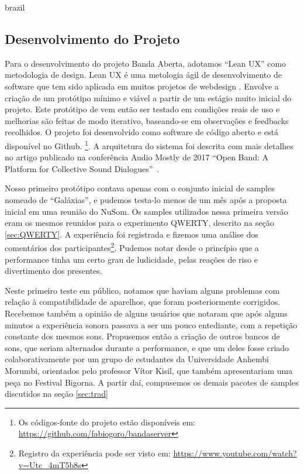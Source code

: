 \begin{otherlanguage*}{brazil}
\subsection{Desenvolvimento do Projeto}
Para o desenvolvimento do projeto Banda Aberta, adotamos ``Lean UX'' como metodologia de design. Lean UX é uma metologia ágil de desenvolvimento de software que tem sido aplicada em muitos projetos de webdesign \cite{leanux}. Envolve a criação de um protótipo mínimo e viável a partir de um estágio muito inicial do projeto. Este protótipo de vem então ser testado em condições reais de uso e melhorias são feitas de modo iterativo, baseando-se em observações e feedbacks recolhidos. O projeto foi desenvolvido como software de código aberto e está disponível no Github. \footnote{Os códigos-fonte do projeto estão disponíveis em: \url{https://github.com/fabiogoro/bandaserver}}. A arquitetura do sistema foi descrita com mais detalhes no artigo publicado na conferência Audio Mostly de 2017 ``Open Band: A Platform for Collective Sound Dialogues''~\cite{Stolfi2017}.

Nosso primeiro protótipo contava apenas com o conjunto inicial de samples nomeado de ``Galáxias'', e pudemos testa-lo menos de um mês após a proposta inicial em uma reunião do NuSom. Os samples utilizados nessa primeira versão eram os mesmos reunidos para o experimento QWERTY, descrito na seção \ref{sec:QWERTY}. A experiência foi registrada e fizemos uma análise dos comentários dos participantes\footnote{Registro da experiência pode ser visto em: \url{https://www.youtube.com/watch?v=Utc_4mT5b8s}}. Pudemos notar desde o princípio que a performance tinha um certo grau de ludicidade, pelas reações de riso e divertimento dos presentes. 


Neste primeiro teste em público, notamos que haviam alguns problemas com relação à compatibilidade de aparelhos, que foram posteriormente corrigidos. Recebemos também a opinião de alguns usuários que notaram que após alguns minutos a experiência sonora passava a ser um pouco entediante, com a repetição constante dos mesmos sons. Propusemos então a criação de outros bancos de sons, que seriam alternados durante a performance, e que um deles fosse criado colaborativamente por um grupo de estudantes da Universidade Anhembi Morumbi, orientados pelo professor Vítor Kisil,  que também apresentariam uma peça no Festival Bigorna. A partir daí, compusemos os demais pacotes de samples discutidos na seção \ref{sec:trad}


\end{otherlanguage*}
